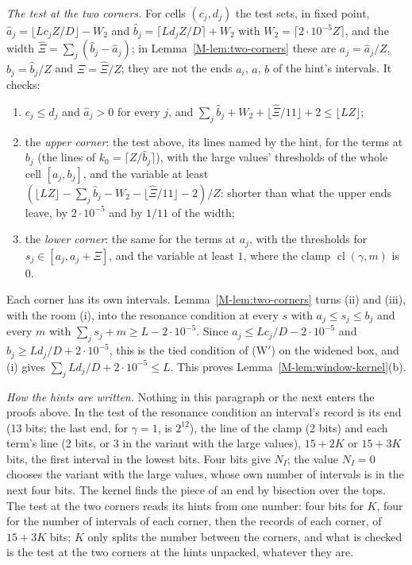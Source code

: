 \documentclass[11pt]{article}
\numberwithin{equation}{section}
\begin{document}
\emph{The test at the two corners.} For cells $(c_j, d_j)$ the test sets, in fixed point, $\hat a_j = \lfloor L c_j
Z/D \rfloor - W_2$ and $\hat b_j = \lceil L d_j Z/D \rceil + W_2$ with $W_2 = \lceil 2 \cdot 10^{-5} Z \rceil$, and
the width $\hat\Xi = \sum_j (\hat b_j - \hat a_j)$; in Lemma~\ref{M-lem:two-corners} these are $a_j = \hat a_j/Z$,
$b_j = \hat b_j/Z$ and $\Xi = \hat\Xi/Z$; they are not the ends $a_i$, $a$, $b$ of the hint's intervals. It checks:
\begin{enumerate}
\item[(i)] $c_j \le d_j$ and $\hat a_j > 0$ for every $j$, and $\sum_j \hat b_j + W_2 + \lfloor \hat\Xi/11 \rfloor + 2
  \le \lfloor LZ \rfloor$;
\item[(ii)] the \emph{upper corner}: the test above, its lines named by the hint, for the terms at $b_j$ (the lines of
  $k_0 = \lceil Z/\hat b_j \rceil$), with the large values' thresholds of the whole cell $[a_j, b_j]$, and the variable
  at least $(\lfloor LZ \rfloor - \sum_j \hat b_j - W_2 - \lfloor \hat\Xi/11 \rfloor - 2)/Z$: shorter than what the
  upper ends leave, by $2 \cdot 10^{-5}$ and by $1/11$ of the width;
\item[(iii)] the \emph{lower corner}: the same for the terms at $a_j$, with the thresholds for $s_j \in [a_j, a_j +
  \Xi]$, and the variable at least $1$, where the clamp $\operatorname{cl}(\gamma, m)$ is $0$.
\end{enumerate}
Each corner has its own intervals. Lemma~\ref{M-lem:two-corners} turns (ii) and (iii), with the room (i), into the
resonance condition at every $s$ with $a_j \le s_j \le b_j$ and every $m$ with $\sum_j s_j + m \ge L - 2 \cdot
10^{-5}$. Since $a_j \le L c_j/D - 2 \cdot 10^{-5}$ and $b_j \ge L d_j/D + 2 \cdot 10^{-5}$, this is the tied condition
of (W$'$) on the widened box, and (i) gives $\sum_j L d_j/D + 2 \cdot 10^{-5} \le L$. This proves
Lemma~\ref{M-lem:window-kernel}(b).

\emph{How the hints are written.} Nothing in this paragraph or the next enters the proofs above. In the test of the
resonance condition an interval's record is its end (13 bits; the last end, for $\gamma = 1$, is $2^{12}$), the line
of the clamp (2 bits) and each term's line (2 bits, or 3 in the variant with the large values), $15 + 2K$ or $15 + 3K$
bits, the first interval in the lowest bits. Four bits give $N_I$; the value $N_I = 0$ chooses the variant with the
large values, whose own number of intervals is in the next four bits. The kernel finds the piece of an end by
bisection over the tops. The test at the two corners reads its hints from one number: four bits for $K$, four for the
number of intervals of each corner, then the records of each corner, of $15 + 3K$ bits; $K$ only splits the number
between the corners, and what is checked is the test at the two corners at the hints unpacked, whatever they are.
\end{document}
